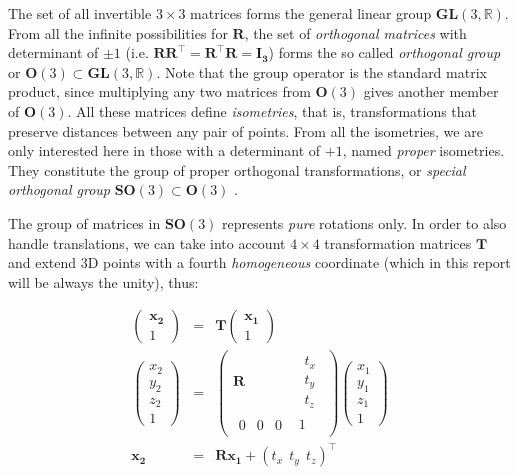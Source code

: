 \documentclass[a4paper,11pt]{report}
\begin{document}
The set of all invertible $3 \times 3$ matrices forms the 
general linear group $\mathbf{GL}(3,\mathbb{R})$.
From all the infinite possibilities for $\mathbf{R}$, the set
of \emph{orthogonal matrices} with determinant of $\pm 1$ 
(i.e. $\mathbf{R}\mathbf{R}^\top=\mathbf{R}^\top\mathbf{R} = \mathbf{I_3}$)
forms the so called \emph{orthogonal group} or $\mathbf{O}(3) \subset \mathbf{GL}(3,\mathbb{R})$.
Note that the group operator is the standard matrix product, since multiplying 
any two matrices from $\mathbf{O}(3)$ gives another member of $\mathbf{O}(3)$.
All these matrices define \emph{isometries}, that is, transformations that
preserve distances between any pair of points. 
From all the isometries, we are only interested here in those with a 
determinant of $+1$, named \emph{proper} isometries. 
They constitute the group of proper orthogonal transformations, or
\emph{special orthogonal group} $\mathbf{SO}(3) \subset \mathbf{O}(3)$ 
\cite{gallier2001geometric}.

The group of matrices in $\mathbf{SO}(3)$ represents \emph{pure} rotations only.
In order to also handle translations, we can take into account $4 \times 4$
transformation matrices $\mathbf{T}$ and extend 3D points with a fourth 
\emph{homogeneous} coordinate (which in this report will be always the unity), 
thus:

\begin{eqnarray}
\left(
\begin{array}{c}
 \mathbf{x_2} \\ 1
\end{array}
\right)
&=& 
\mathbf{T}
\left(
\begin{array}{c}
 \mathbf{x_1} \\ 1
\end{array}
\right)
\nonumber \\
\label{eq:x2_T_x1}
\left(
\begin{array}{c}
 x_2 \\ y_2 \\ z_2 \\ 1
\end{array}
\right)
&=& 
\left(
\begin{array}{c|c}
\mathbf{R} &  
 \begin{array}{c}
   t_x \\ t_y \\ t_z 
 \end{array} \\
\hline 
 \begin{array}{ccc}
  0 & 0 & 0
 \end{array} 
 & 
 1
\end{array}
\right)
\left(
\begin{array}{c}
 x_1 \\ y_1 \\ z_1 \\ 1
\end{array}
\right)
\\
\mathbf{x_2} &=& \mathbf{R} \mathbf{x_1} + 
\left(
t_x ~~ t_y ~~ t_z
\right)^\top \nonumber
\end{eqnarray}
\end{document}
